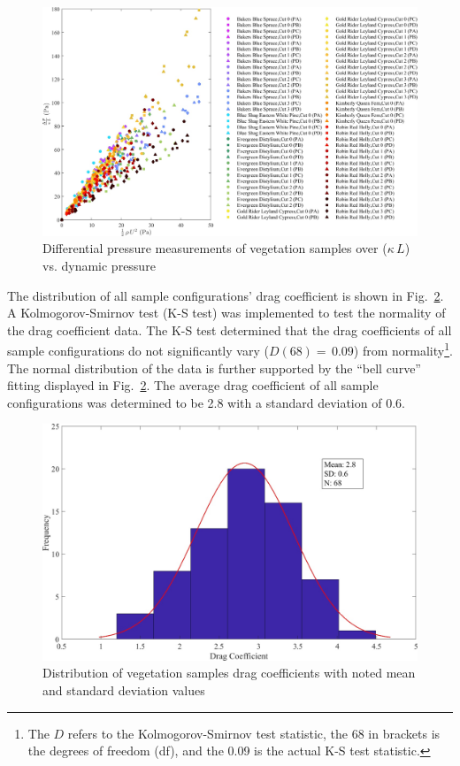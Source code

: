 \documentclass[12pt]{article}
\begin{document}
\begin{figure}
	\centering
	\includegraphics[width=\textwidth,keepaspectratio]{Picture9.jpg}
	\caption{Differential pressure measurements of vegetation samples over ($\kappa \, L$) vs. dynamic pressure}
	\label{fig:DPoveraf(Overall)}
\end{figure}

The distribution of all sample configurations' drag coefficient is shown in Fig.~\ref{fig:Histogram}. A Kolmogorov-Smirnov test (K-S test) was implemented to test the normality of the drag coefficient data. The K-S test determined that the drag coefficients of all sample configurations do not significantly vary ($D(68)=\,0.09$) from normality\footnote{The $D$ refers to the Kolmogorov-Smirnov test statistic, the 68 in brackets is the degrees of freedom (df), and the 0.09 is the actual K-S test statistic.}. The normal distribution of the data is further supported by the ``bell curve'' fitting displayed in  Fig.~\ref{fig:Histogram}. The average drag coefficient of all sample configurations was determined to be 2.8 with a standard deviation of 0.6.

\begin{figure}[!h]
\includegraphics[width=\textwidth,keepaspectratio]{Picture11.jpg}
	\caption[Distribution of drag coefficients]{Distribution of vegetation samples drag coefficients with noted mean and standard deviation values}
	\label{fig:Histogram}
\end{figure}
\end{document}
